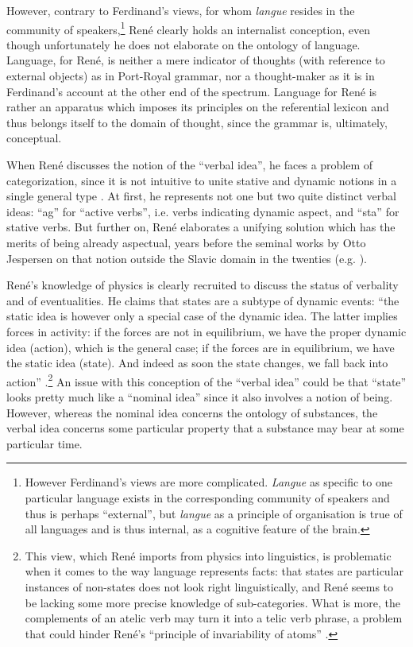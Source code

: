 \documentclass[output=paper]{langsci/langscibook}
\begin{document}
However, contrary to Ferdinand’s views, for whom \emph{langue} resides
in the community of speakers,\footnote{However Ferdinand’s views are
  more complicated. \emph{Langue} as specific to one particular
  language exists in the corresponding community of speakers and thus
  is perhaps ``external'', but \emph{langue} as a principle of
  organisation is true of all languages and is thus internal, as a
  cognitive feature of the brain.} René clearly holds an
internalist conception, even though unfortunately he does not
elaborate on the ontology of language. Language, for René, is neither a
mere indicator of thoughts (with reference to external objects) as in
Port-Royal grammar, nor a thought-maker as it is in Ferdinand’s
account at the other end of the spectrum. Language for René is rather
an apparatus which imposes its principles on the referential lexicon
and thus belongs itself to the domain of thought, since the grammar
is, ultimately, conceptual.

When René discusses the notion of the ``verbal idea'', he faces a problem
of categorization, since it is not intuitive to unite stative and
dynamic notions in a single general type
\citep[17]{r.desaussure11:formation}. At first, he represents not
one but two quite distinct verbal ideas: ``ag'' for ``active verbs'',
i.e. verbs indicating dynamic aspect, and ``sta'' for stative verbs. But
further on, René elaborates a unifying solution which has the merits of
being already aspectual, years before the seminal works by Otto
Jespersen on that notion outside the Slavic domain in the twenties
(e.g. \citealt{jespersen24:philosophy-of-grammar}).

René's knowledge of physics is clearly recruited to discuss the status
of verbality and of eventualities. He claims that states are a subtype
of dynamic events: “the static idea is however only a special case of
the dynamic idea. The latter implies forces in activity: if the forces
are not in equilibrium, we have the proper dynamic idea (action),
which is the general case; if the forces are in equilibrium, we have
the static idea (state). And indeed as soon the state changes, we fall
back into action”
\citep[32--33]{r.desaussure11:formation}.\footnote{This view, which
  René imports from physics into linguistics, is problematic when it
  comes to the way language represents facts: that states are
  particular instances of non-states does not look right
  linguistically, and René seems to be lacking some more precise
  knowledge of sub-categories. What is more, the complements of an
  atelic verb may turn it into a telic verb phrase, a problem that
  could hinder René’s ``principle of invariability of atoms''
  \citep[21]{r.desaussure11:formation}.}  An issue with this
conception of the ``verbal idea'' could be that ``state'' looks pretty
much like a ``nominal idea'' since it also involves a notion of
being. However, whereas the nominal idea concerns the ontology of
substances, the verbal idea concerns some particular property that a
substance may bear at some particular time.\largerpage[1.5]
\end{document}
